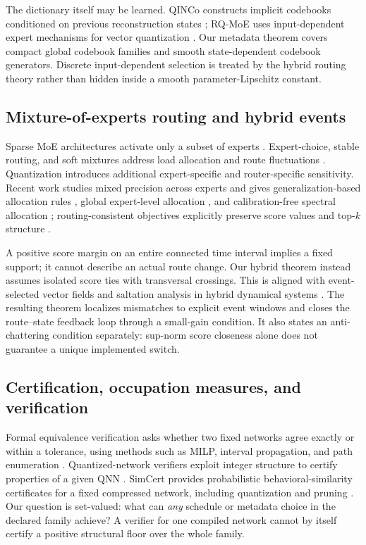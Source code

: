 \documentclass[twoside,11pt]{article}
\begin{document}
The dictionary itself may be learned.  QINCo constructs implicit codebooks conditioned on previous reconstruction states \citep{HuijbenEtAl2024QINCo}; RQ-MoE uses input-dependent expert mechanisms for vector quantization \citep{ZhongEtAl2026RQMoE}.  Our metadata theorem covers compact global codebook families and smooth state-dependent codebook generators.  Discrete input-dependent selection is treated by the hybrid routing theory rather than hidden inside a smooth parameter-Lipschitz constant.

\subsection{Mixture-of-experts routing and hybrid events}

Sparse MoE architectures activate only a subset of experts \citep{ShazeerEtAl2017,FedusZophShazeer2022}.  Expert-choice, stable routing, and soft mixtures address load allocation and route fluctuations \citep{ZhouEtAl2022ExpertChoice,DaiEtAl2022StableMoE,PuigcerverEtAl2024}.  Quantization introduces additional expert-specific and router-specific sensitivity.  Recent work studies mixed precision across experts and gives generalization-based allocation rules \citep{ChowdhuryEtAl2026MoETheory}, global expert-level allocation \citep{DengEtAl2026GEMQ}, and calibration-free spectral allocation \citep{YangEtAl2026AlphaQ}; routing-consistent objectives explicitly preserve score values and top-$k$ structure \citep{ParkEtAl2026VSRAQ}.

A positive score margin on an entire connected time interval implies a fixed support; it cannot describe an actual route change.  Our hybrid theorem instead assumes isolated score ties with transversal crossings.  This is aligned with event-selected vector fields and saltation analysis in hybrid dynamical systems \citep{SacconEtAl2014,BurdenEtAl2016EventSelected,KongEtAl2024Saltation}.  The resulting theorem localizes mismatches to explicit event windows and closes the route--state feedback loop through a small-gain condition.  It also states an anti-chattering condition separately: sup-norm score closeness alone does not guarantee a unique implemented switch.

\subsection{Certification, occupation measures, and verification}

Formal equivalence verification asks whether two fixed networks agree exactly or within a tolerance, using methods such as MILP, interval propagation, and path enumeration \citep{TeuberEtAl2021Equivalence}.  Quantized-network verifiers exploit integer structure to certify properties of a given QNN \citep{HuangEtAl2024QNNVerify}.  SimCert provides probabilistic behavioral-similarity certificates for a fixed compressed network, including quantization and pruning \citep{LiSongLi2026SimCert}.  Our question is set-valued: what can \emph{any} schedule or metadata choice in the declared family achieve?  A verifier for one compiled network cannot by itself certify a positive structural floor over the whole family.
\end{document}
